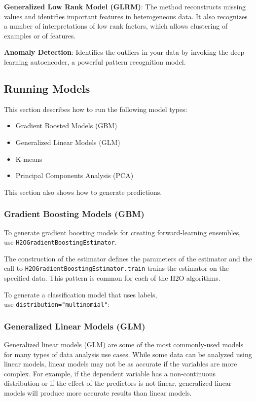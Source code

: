 {{\textbf{Generalized Low Rank Model (GLRM)}}: The method reconstructs missing values and identifies important features in heterogeneous data. It also recognizes a number of  interpretations of low rank factors, which allows clustering of examples or of features.

{\textbf{Anomaly Detection}}: Identifies the outliers in your data by invoking the deep learning autoencoder, a powerful pattern recognition model.

\subsection{Running Models}
This section describes how to run the following model types:

\begin{itemize}
\item Gradient Boosted Models (GBM)
\item Generalized Linear Models (GLM)
\item K-means
\item Principal Components Analysis (PCA)

\end{itemize}
This section also shows how to generate predictions.

\subsubsection{Gradient Boosting Models (GBM)}
To generate gradient boosting models for creating forward-learning ensembles,
use {\texttt{H2OGradientBoostingEstimator}}.  

The construction of the estimator
defines the parameters of the estimator and the call to
{\texttt{H2OGradientBoostingEstimator.train}}  trains the estimator on
the specified data.  This pattern is common for each of the H2O algorithms.

\newpage



To generate a classification model that uses labels, \\ use 
{\texttt{distribution="multinomial"}}:



\subsubsection{Generalized Linear Models (GLM)}
Generalized linear models (GLM) are some of the most commonly-used
models for many types of data analysis use cases. While some data
can be analyzed using linear models, linear models
may not be as accurate if the variables are more complex.
For example, if the dependent variable has a non-continuous
distribution or if the effect of the predictors is not linear,
generalized linear models will produce more accurate results than linear models.

}
